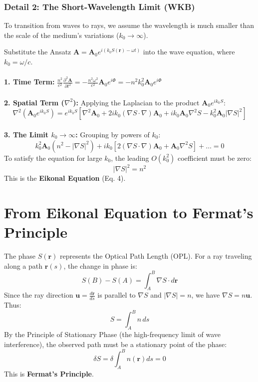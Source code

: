 \documentclass[12pt,a4paper]{article}
\begin{document}
\subsubsection{Detail 2: The Short-Wavelength Limit (WKB)}
To transition from waves to rays, we assume the wavelength is much smaller than the scale of the medium's variations ($k_0 \to \infty$).

\begin{tcolorbox}[colback=green!5!white,colframe=green!50!black,title=Box 2: Detailed WKB Computation for the Eikonal Equation]
Substitute the Ansatz $\mathbf{A} = \mathbf{A}_0 e^{i(k_0 S(\mathbf{r}) - \omega t)}$ into the wave equation, where $k_0 = \omega/c$. 
\\ \\
\textbf{1. Time Term:} $\frac{n^2}{c^2} \frac{\partial^2 \mathbf{A}}{\partial t^2} = -\frac{n^2 \omega^2}{c^2} \mathbf{A}_0 e^{i\Phi} = -n^2 k_0^2 \mathbf{A}_0 e^{i\Phi}$
\\ \\
\textbf{2. Spatial Term ($\nabla^2$):}
Applying the Laplacian to the product $\mathbf{A}_0 e^{ik_0 S}$:
$$\nabla^2 (\mathbf{A}_0 e^{ik_0 S}) = e^{ik_0 S} \left[ \nabla^2 \mathbf{A}_0 + 2ik_0 (\nabla S \cdot \nabla)\mathbf{A}_0 + ik_0 \mathbf{A}_0 \nabla^2 S - k_0^2 \mathbf{A}_0 |\nabla S|^2 \right]$$
\\
\textbf{3. The Limit $k_0 \to \infty$:}
Grouping by powers of $k_0$:
$$k_0^2 \mathbf{A}_0 (n^2 - |\nabla S|^2) + ik_0 [2(\nabla S \cdot \nabla)\mathbf{A}_0 + \mathbf{A}_0 \nabla^2 S] + \dots = 0$$
To satisfy the equation for large $k_0$, the leading $O(k_0^2)$ coefficient must be zero:
$$|\nabla S|^2 = n^2$$
This is the \textbf{Eikonal Equation} (Eq. 4).
\end{tcolorbox}



\section{From Eikonal Equation to Fermat's Principle}
The phase $S(\mathbf{r})$ represents the Optical Path Length (OPL). For a ray traveling along a path $\mathbf{r}(s)$, the change in phase is:
\begin{equation}
S(B) - S(A) = \int_A^B \nabla S \cdot d\mathbf{r}
\end{equation}
Since the ray direction $\mathbf{u} = \frac{d\mathbf{r}}{ds}$ is parallel to $\nabla S$ and $|\nabla S| = n$, we have $\nabla S = n \mathbf{u}$. Thus:
\begin{equation}
S = \int_A^B n \, ds
\end{equation}
By the Principle of Stationary Phase (the high-frequency limit of wave interference), the observed path must be a stationary point of the phase:
\begin{equation}
\delta S = \delta \int_A^B n(\mathbf{r}) ds = 0
\end{equation}
This is \textbf{Fermat's Principle}.
\end{document}
